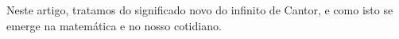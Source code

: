 \documentclass[journal,transmag]{IEEEtran}
\begin{document}
Neste artigo, tratamos do significado novo do infinito de Cantor,
e como isto se emerge na matemática e no nosso cotidiano.

%
%



%
%
\end{document}
